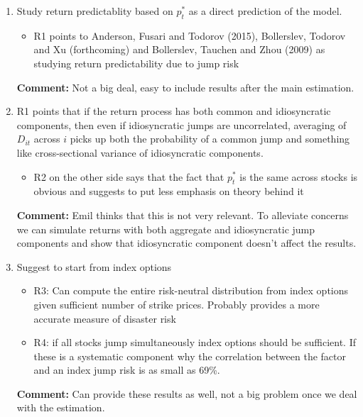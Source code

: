 \documentclass[11pt]{article}
\begin{document}
\begin{enumerate}
	\item Study return predictablity based on $p^*_t$ as a direct prediction of the model. 
	\begin{itemize}
		\item R1 points to Anderson, Fusari and Todorov (2015), Bollerslev, Todorov and Xu (forthcoming) and Bollerslev, Tauchen and Zhou (2009) as studying return predictability due to jump risk
	\end{itemize}
	\textbf{Comment:} Not a big deal, easy to include results after the main estimation.
	
	\item R1 points that if the return process has both common and idiosyncratic components, then even if idiosyncratic jumps are uncorrelated, averaging of $D_{it}$ across $i$ picks up both the probability of a common jump and something like cross-sectional variance of idiosyncratic components.
	\begin{itemize}
		\item R2 on the other side says that the fact that $p^*_{t}$ is the same across stocks is obvious and suggests to put less emphasis on theory behind it
	\end{itemize}
	\textbf{Comment:} Emil thinks that this is not very relevant. To alleviate concerns we can simulate returns with both aggregate and idiosyncratic jump components and show that idiosyncratic component doesn't affect the results.

	\item Suggest to start from index options
	\begin{itemize}
		\item R3: Can compute the entire risk-neutral distribution from index options given sufficient number of strike prices. Probably provides a more accurate measure of disaster risk
		\item R4: if all stocks jump simultaneously index options should be sufficient. If these is a systematic component why the correlation between the factor and an index jump risk is as small as 69\%.
	\end{itemize}

	\textbf{Comment:} Can provide these results as well, not a big problem once we deal with the estimation.


\end{enumerate}
\end{document}
